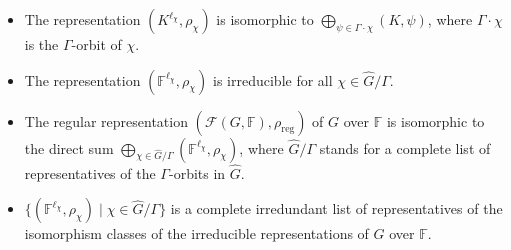 \documentclass[10pt,a4paper]{amsart}
\def\FF{\mathbb{F}}
\def\field{K}
\begin{document}
\begin{proposition} \label{prop:irrep abelian} 
\begin{itemize}
\item[(i)] The representation $(\field^{\ell_\chi},\rho_\chi)$ is isomorphic to 
$\bigoplus_{\psi\in \Gamma\cdot\chi} (\field,\psi)$, where $\Gamma\cdot \chi$ is the 
$\Gamma$-orbit of $\chi$. 
\item[(ii)] The representation $(\FF^{\ell_\chi},\rho_\chi)$ is irreducible for all $\chi\in \widehat G/\Gamma$. 
\item[(iii)] The regular representation $(\mathcal{F}(G,\FF),\rho_{\mathrm{reg}})$ of $G$ over $\FF$ 
is isomorphic to the direct sum 
$\bigoplus_{\chi\in \widehat G/\Gamma}(\FF^{\ell_\chi},\rho_\chi)$,  
where $\widehat G/\Gamma$ stands for a complete list of representatives of the $\Gamma$-orbits in $\widehat G$. 
\item[(iv)]  $\{(\FF^{\ell_\chi},\rho_\chi)\mid \chi\in \widehat G/\Gamma\}$  is a complete irredundant list of 
representatives of the isomorphism classes of the irreducible representations of $G$ over $\FF$. 
\end{itemize}  
\end{proposition}
\end{document}
